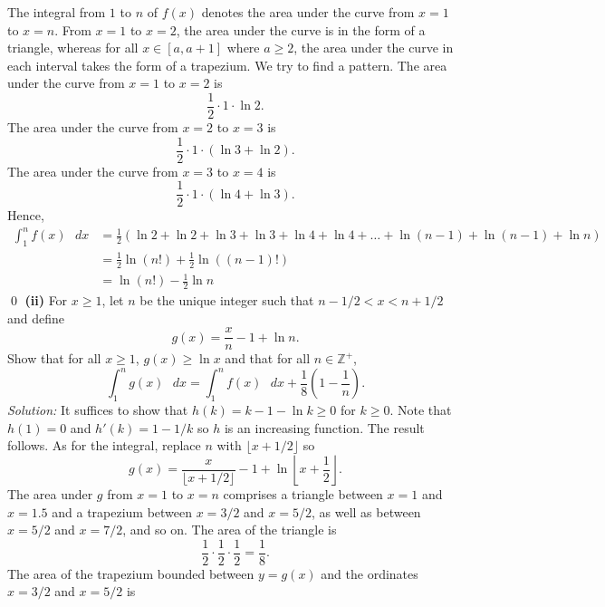 \documentclass{article}
\begin{document}
\newline
\newline The integral from $1$ to $n$ of $f(x)$ denotes the area under the curve from $x=1$ to $x=n$. From $x=1$ to $x=2$, the area under the curve is in the form of a triangle, whereas for all $x\in [a,a+1]$ where $a \ge 2$, the area under the curve in each interval takes the form of a trapezium.
\newline
\newline We try to find a pattern. The area under the curve from $x=1$ to $x=2$ is \[\frac{1}{2}\cdot 1 \cdot \operatorname{ln}2.\] The area under the curve from $x=2$ to $x=3$ is \[\frac{1}{2}\cdot 1 \cdot (\operatorname{ln}3+\operatorname{ln}2).\]
The area under the curve from $x=3$ to $x=4$ is \[\frac{1}{2}\cdot 1 \cdot (\operatorname{ln}4+\operatorname{ln}3).\] Hence, \begin{align*}
    \int_{1}^{n}f(x)\text{ }dx&=\frac{1}{2}\left( \ln 2+\ln 2+\ln 3+\ln 3+\ln 4+\ln 4+\ldots +\ln \left( n-1 \right)+\ln \left( n-1 \right)+\ln n \right)\\
    &=\frac{1}{2}\ln \left( n! \right)+\frac{1}{2}\ln \left( \left( n-1 \right)! \right)\\
    &=\ln \left( n! \right)-\frac{1}{2}\ln n
\end{align*} \qed
\newline
\newline\textbf{(ii)} For $x \ge 1$, let $n$ be the unique integer such that $n-1/2<x<n+1/2$ and define \[g(x)=\frac{x}{n}-1+\operatorname{ln}n.\]
Show that for all $x\ge 1$, $g(x)\ge \operatorname{ln}x$ and that for all $n \in \mathbb{Z}^+$, \[\int_{1}^{n}g(x)\text{ }dx=\int_{1}^{n}f(x)\text{ }dx+\frac{1}{8}\left(1-\frac{1}{n}\right).\]
\textit{Solution:} It suffices to show that $h(k)=k-1-\operatorname{ln}k\ge 0$ for $k \ge 0$. Note that $h(1)=0$ and $h'(k)=1-1/k$ so $h$ is an increasing function. The result follows.
\newline
\newline As for the integral, replace $n$ with $\lfloor{x}+1/2\rfloor$ so \[g(x)=\frac{x}{\lfloor{x+1/2}\rfloor}-1+\operatorname{ln}\left \lfloor {x+\frac{1}{2}} \right \rfloor.\] The area under $g$ from $x=1$ to $x=n$ comprises a triangle between $x=1$ and $x=1.5$ and a trapezium between $x=3/2$ and $x=5/2$, as well as between $x=5/2$ and $x=7/2$, and so on.
\newline
\newline The area of the triangle is \[\frac{1}{2}\cdot \frac{1}{2} \cdot \frac{1}{2} =\frac{1}{8}.\]
The area of the trapezium bounded between $y=g(x)$ and the ordinates $x=3/2$ and $x=5/2$ is 
\end{document}
